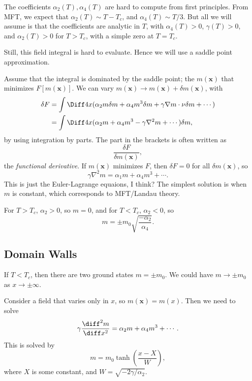 \documentclass[12pt]{article}
\begin{document}
The coefficients $\alpha_2(T), \alpha_4(T)$ are hard to compute from first principles. From MFT, we expect that $\alpha_2(T) \sim T - T_c$, and $\alpha_4(T) \sim T/3$. But all we will assume is that the coefficients are analytic in $T$, with $\alpha_4(T) > 0$, $\gamma(T) > 0$, and $\alpha_2(T) > 0$ for $T > T_c$, with a simple zero at $T = T_c$.

Still, this field integral is hard to evaluate. Hence we will use a saddle point approximation.

Assume that the integral is dominated by the saddle point; the $m(\mathbf{x})$ that minimizes $F[m(\mathbf{x})]$. We can vary $m(\mathbf{x}) \to m(\mathbf{x}) + \delta m(\mathbf{x})$, with
\begin{align*}
\delta F &= \int \Diff 4 x (\alpha_2 m \delta m + \alpha_4 m^3 \delta m + \gamma \nabla m \cdot \nu \delta m + \cdots ) \\
		   &= \int \Diff 4 x (\alpha_2 m + \alpha_4 m^3 - \gamma \nabla ^2 m + \cdots ) \delta m,
\end{align*}
by using integration by parts. The part in the brackets is often written as
\[
\frac{\delta F}{\delta m(\mathbf{x})},
\]
the \emph{functional derivative}. If $m(\mathbf{x})$ minimizes $F$, then $\delta F = 0$ for all $\delta m(\mathbf{x})$, so
\[
\gamma \nabla^2 m = \alpha_1 m + \alpha_4 m^3 + \cdots.
\]
This is just the Euler-Lagrange equaions, I think? The simplest solution is when $m$ is constant, which corresponds to MFT/Landau theory.

For $T > T_c$, $\alpha_2 > 0$, so $m = 0$, and for $T < T_c$, $\alpha_2 < 0$, so
\[
	m = \pm m_0 \sqrt{\frac{-\alpha_2}{\alpha_4}}.
\]

\subsection{Domain Walls}%
\label{sub:dw}

If $T < T_c$, then there are two ground states $m = \pm m_0$. We could have $m \to \pm m_0$ as $x \to \pm \infty$.

Consider a field that varies only in $x$, so $m(\mathbf{x}) = m(x)$. Then we need to solve
\[
\gamma \frac{\diff^2 m}{\diff x^2} = \alpha_2 m + \alpha_4 m^3 + \cdots.
\]
This is solved by
\[
m = m_0 \tanh \left( \frac{x - X}{W} \right),
\]
where $X$ is some constant, and $W = \sqrt{-2 \gamma/\alpha_2}$.

\begin{center}
\end{center}
\end{document}
